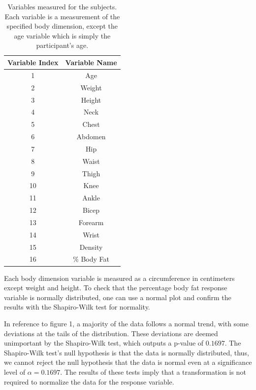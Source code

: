 \documentclass[12pt]{article}
\begin{document}
\begin{table}
\centering
\tabcolsep=0.11cm
\begin{tabular}{cc}
    \hline
    Variable Index & Variable Name \\
     \hline
     1  & Age  \\
     \hline
     2  & Weight \\
     \hline
     3  & Height \\
     \hline
     4  & Neck \\
     \hline
     5 & Chest \\
     \hline
     6 & Abdomen \\
     \hline
     7 & Hip \\
     \hline
     8 & Waist \\
     \hline
     9 & Thigh \\
     \hline
     10 & Knee \\
     \hline
     11 & Ankle \\
     \hline 
     12 & Bicep \\
     \hline
     13 & Forearm \\
     \hline 
     14 & Wrist \\
     \hline
     15 & Density \\
     \hline
     16 & \% Body Fat \\
     \hline
\end{tabular}
\caption{Variables measured for the subjects. Each variable is a measurement of the specified body dimension, except the age variable which is simply the participant's age.}
\end{table}

Each body dimension variable is measured as a circumference in centimeters except weight and height. To check that the percentage body fat response variable is normally distributed, one can use a normal plot and confirm the results with the Shapiro-Wilk test for normality.



In reference to figure 1, a majority of the data follows a normal trend, with some deviations at the tails of the distribution. These deviations are deemed unimportant by the Shapiro-Wilk test, which outputs a p-value of $0.1697$. The Shapiro-Wilk test's null hypothesis is that the data is normally distributed, thus, we cannot reject the null hypothesis that the data is normal even at a significance level of $\alpha = 0.1697$. The results of these tests imply that a transformation is not required to normalize the data for the response variable.
\end{document}
